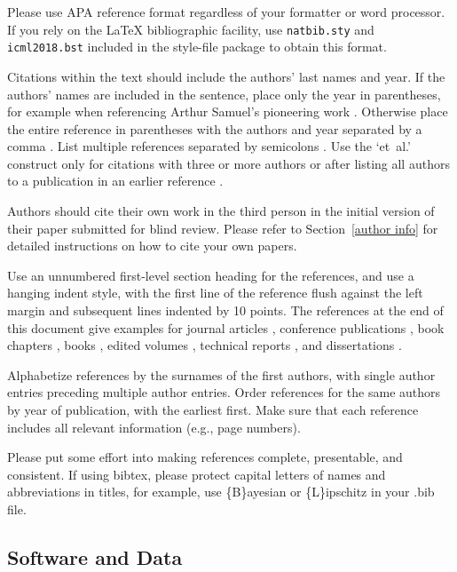 \documentclass{article}
\begin{document}
Please use APA reference format regardless of your formatter
or word processor. If you rely on the \LaTeX\/ bibliographic
facility, use \texttt{natbib.sty} and \texttt{icml2018.bst}
included in the style-file package to obtain this format.

Citations within the text should include the authors' last names and
year. If the authors' names are included in the sentence, place only
the year in parentheses, for example when referencing Arthur Samuel's
pioneering work . Otherwise place the entire
reference in parentheses with the authors and year separated by a
comma \cite{Samuel59}. List multiple references separated by
semicolons \cite{kearns89,Samuel59,mitchell80}. Use the `et~al.'
construct only for citations with three or more authors or after
listing all authors to a publication in an earlier reference \cite{MachineLearningI}.

Authors should cite their own work in the third person
in the initial version of their paper submitted for blind review.
Please refer to Section~\ref{author info} for detailed instructions on how to
cite your own papers.

Use an unnumbered first-level section heading for the references, and use a
hanging indent style, with the first line of the reference flush against the
left margin and subsequent lines indented by 10 points. The references at the
end of this document give examples for journal articles \cite{Samuel59},
conference publications \cite{langley00}, book chapters \cite{Newell81}, books
\cite{DudaHart2nd}, edited volumes \cite{MachineLearningI}, technical reports
\cite{mitchell80}, and dissertations \cite{kearns89}.

Alphabetize references by the surnames of the first authors, with
single author entries preceding multiple author entries. Order
references for the same authors by year of publication, with the
earliest first. Make sure that each reference includes all relevant
information (e.g., page numbers).

Please put some effort into making references complete, presentable, and
consistent. If using bibtex, please protect capital letters of names and
abbreviations in titles, for example, use \{B\}ayesian or \{L\}ipschitz
in your .bib file.

\subsection{Software and Data}
\end{document}
